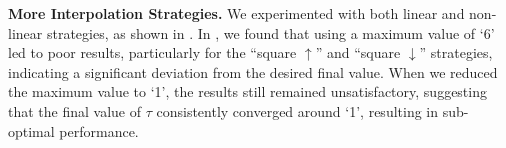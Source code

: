 

\begin{table}[t]
\centering
\caption{Ablation study on the role of classifier type on COIN dataset.}
\vspace{-3mm}
\label{tab:classifier_coin}
\end{table}




\textbf{More Interpolation Strategies.} We experimented with both linear and non-linear strategies, as shown in . In , we found that using a maximum value of `6' led to poor results, particularly for the ``square $\uparrow$'' and ``square $\downarrow$'' strategies, indicating a significant deviation from the desired final value. When we reduced the maximum value to `1', the results still remained unsatisfactory, suggesting that the final value of $\tau$ consistently converged around `1', resulting in sub-optimal performance.





